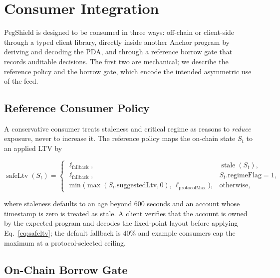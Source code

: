 \documentclass[aps,prx,reprint,nofootinbib,longbibliography]{revtex4-2}
\begin{document}
\section{Consumer Integration}
\label{sec:consumer}

PegShield is designed to be consumed in three ways: off-chain or client-side
through a typed client library, directly inside another Anchor program by deriving
and decoding the PDA, and through a reference borrow gate that records auditable
decisions. The first two are mechanical; we describe the reference policy and the
borrow gate, which encode the intended asymmetric use of the feed.

\subsection{Reference Consumer Policy}

A conservative consumer treats staleness and critical regime as reasons to
\emph{reduce} exposure, never to increase it. The reference policy maps the
on-chain state $S_t$ to an applied LTV by
\begin{widetext}
\begin{equation}
\operatorname{safeLtv}(S_t)=
\begin{cases}
\ell_{\mathrm{fallback}}, & \operatorname{stale}(S_t),\\
\ell_{\mathrm{fallback}}, & S_t.\mathrm{regimeFlag}=1,\\
\min\!\bigl(\max(S_t.\mathrm{suggestedLtv},0),\,\ell_{\mathrm{protocolMax}}\bigr), & \text{otherwise},
\end{cases}
\label{eq:safeltv}
\end{equation}
\end{widetext}
where staleness defaults to an age beyond 600 seconds and an account whose
timestamp is zero is treated as stale. A client verifies that the account is owned
by the expected program and decodes the fixed-point layout before applying
Eq.~\eqref{eq:safeltv}; the default fallback is 40\% and example consumers cap the
maximum at a protocol-selected ceiling.

\subsection{On-Chain Borrow Gate}
\end{document}
